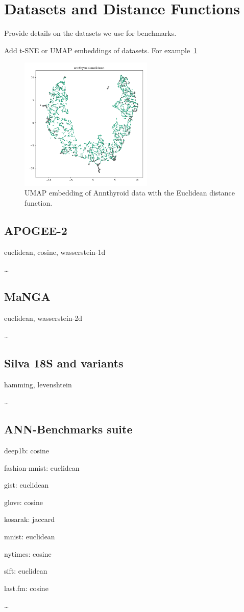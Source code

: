 \section{Datasets and Distance Functions}
\label{sec:datasets-and-distance-functions}

Provide details on the datasets we use for benchmarks.

Add t-SNE or UMAP embeddings of datasets. For example~\ref{fig:discussion:umap-annthyroid-euclidean}

\begin{figure}[ht!]
    \centering
    \includegraphics[width=2.5in]{images/umaps/annthyroid-euclidean-umap2d.png}
    \caption{UMAP embedding of Annthyroid data with the Euclidean distance function.}
    \label{fig:discussion:umap-annthyroid-euclidean}
\end{figure}

\subsection{APOGEE-2}
\label{subsec:datasets:apogee-2}

euclidean, cosine, wasserstein-1d

\dots

\subsection{MaNGA}
\label{subsec:datasets:manga}

euclidean, wasserstein-2d

\dots

\subsection{Silva 18S and variants}
\label{subsec:datasets:silva-18s}

hamming, levenshtein

\dots

\subsection{ANN-Benchmarks suite}
\label{subsec:datasets:ann-benchmarks-suite}

deep1b: cosine

fashion-mnist: euclidean

gist: euclidean

glove: cosine

kosarak: jaccard

mnist: euclidean

nytimes: cosine

sift: euclidean

last.fm: cosine

\dots
